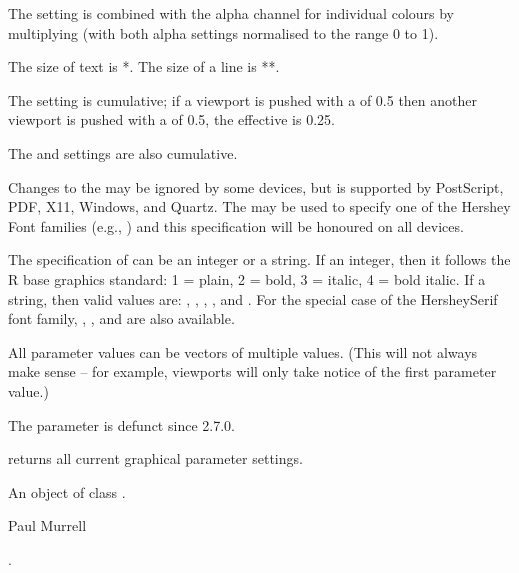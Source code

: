 \begin{Details}
The  setting is combined with the alpha channel for
individual colours by multiplying (with both alpha settings
normalised to the range 0 to 1).

The size of text is *.  The size of a line
is **.

The  setting is cumulative;  if a viewport is pushed
with a  of 0.5 then another viewport is pushed with a
 of 0.5, the effective  is 0.25.

The  and  settings are also cumulative.

Changes to the  may be ignored by some devices,
but is supported by PostScript, PDF, X11, Windows, and Quartz.  The
 may be used to specify one
of the Hershey Font families (e.g., )
and this specification will be honoured
on all devices.

The specification of  can be an integer or a string.
If an integer, then it
follows the R base graphics
standard:  1 = plain, 2 = bold, 3 = italic, 4 = bold italic.
If a string, then valid values are: ,
, , , and
.
For the special case of the HersheySerif font family,
, , and 
are also available.

All parameter values can be vectors of multiple values.  (This will
not always make sense -- for example, viewports will only take
notice of the first parameter value.)

The  parameter is defunct since \R{} 2.7.0.

 returns all current graphical parameter settings.
\end{Details}
%
\begin{Value}
An object of class .
\end{Value}
%
\begin{Author}\relax
Paul Murrell
\end{Author}
%
\begin{SeeAlso}\relax
{}.
\end{SeeAlso}
%
